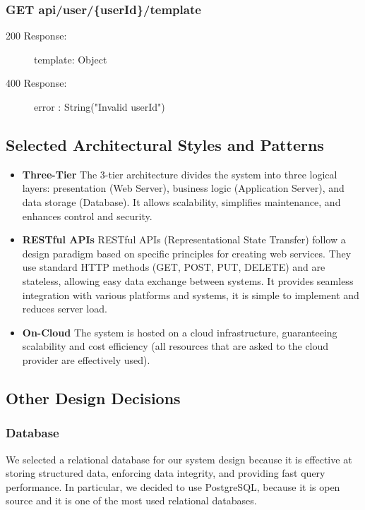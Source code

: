 \documentclass[a4paper,12pt]{article}
\begin{document}
\subsubsection*{GET api/user/\{userId\}/template}
\begin{description}
    \item[200 Response:] template: Object 
    \item[400 Response:] error : String("Invalid userId")
\end{description}


\newpage
\subsection{Selected Architectural Styles and Patterns}
\begin{itemize}
    \item \textbf{Three-Tier} The 3-tier architecture divides the system into three logical layers: presentation (Web Server), business logic (Application Server), and data storage (Database). It allows scalability, simplifies maintenance, and enhances control and security.

    \item \textbf{RESTful APIs} RESTful APIs (Representational State Transfer) follow a design paradigm based on specific principles for creating web services. They use standard HTTP methods (GET, POST, PUT, DELETE) and are stateless, allowing easy data exchange between systems. It provides seamless integration with various platforms and systems, it is simple to implement and reduces server load.

    \item \textbf{On-Cloud} The system is hosted on a cloud infrastructure, guaranteeing scalability and cost efficiency (all resources that are asked to the cloud provider are effectively used).
\end{itemize}

\subsection{Other Design Decisions}
\subsubsection{Database}
We selected a relational database for our system design because it is effective at storing structured data, enforcing data integrity, and providing fast query performance. In particular, we decided to use PostgreSQL, because it is open source and it is one of the most used relational databases.
\end{document}
